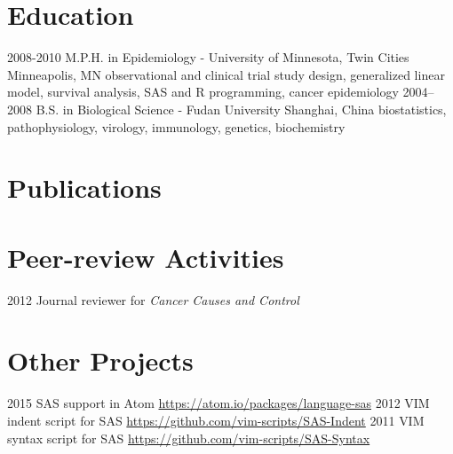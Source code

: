 \documentclass[11pt, print]{friggeri-cv}
\begin{document}
\section{Education}

\begin{entrylist}
  \entry
    {2008-2010}
    {M.P.H. in Epidemiology - University of Minnesota, Twin Cities}
    {Minneapolis, MN}
    {observational and clinical trial study design, generalized linear model, survival analysis, SAS and R programming, cancer epidemiology}
  \entry
    {2004–2008}
    {B.S. in Biological Science - Fudan University}
    {Shanghai, China}
    {biostatistics, pathophysiology, virology, immunology, genetics, biochemistry}
\end{entrylist}

\clearpage

\section{Publications}


\section{Peer-review Activities}

\begin{entrylist}
  \simpleentry
    {2012}
    {Journal reviewer for \textit{Cancer Causes and Control}}
    {}
\end{entrylist}

\section{Other Projects}

\begin{entrylist}
  \simpleentry
    {2015}
    {SAS support in Atom}
    {\href{https://atom.io/packages/language-sas}{https://atom.io/packages/language-sas}}
  \simpleentry
    {2012}
    {VIM indent script for SAS}
    {\href{https://github.com/vim-scripts/SAS-Indent}{https://github.com/vim-scripts/SAS-Indent}}
  \simpleentry
    {2011}
    {VIM syntax script for SAS}
    {\href{https://github.com/vim-scripts/SAS-Syntax}{https://github.com/vim-scripts/SAS-Syntax}}
\end{entrylist}
\end{document}
